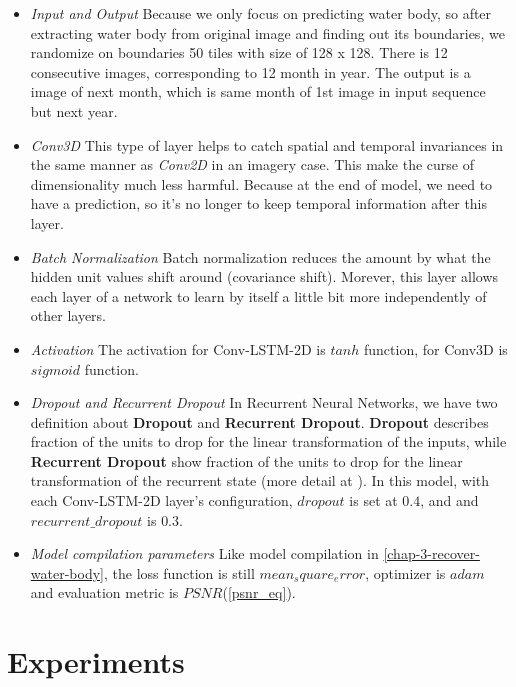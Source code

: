 \begin{itemize}
	\item \textit{Input and Output} Because we only focus on predicting water body, so after extracting water body from original image and finding out its boundaries, we randomize on boundaries 50 tiles with size of 128 x 128. There is 12 consecutive images, corresponding to 12 month in year. The output is a image of next month, which is same month of 1st image in input sequence but next year. 
	
	\item \textit{Conv3D} This type of layer helps to catch spatial and temporal invariances in the same manner as \textit{Conv2D} in an imagery case. This make the curse of dimensionality much less harmful. Because at the end of model, we need to have a prediction, so it's no longer to keep temporal information after this layer.
	
	\item \textit{Batch Normalization} Batch normalization reduces the amount by what the hidden unit values shift around (covariance shift). Morever, this layer allows each layer of a network to learn by itself a little bit more independently of other layers.
	
	\item \textit{Activation} The activation for Conv-LSTM-2D is $tanh$ function, for Conv3D is $sigmoid$ function.
	
	\item \textit{Dropout and Recurrent Dropout} In Recurrent Neural Networks, we have two definition about \textbf{Dropout} and \textbf{Recurrent Dropout}. \textbf{Dropout} describes fraction of the units to drop for the linear transformation of the inputs, while \textbf{Recurrent Dropout} show fraction of the units to drop for the linear transformation of the recurrent state (more detail at \cite{Gal2015}). In this model, with each Conv-LSTM-2D layer's configuration, $dropout$ is set at $0.4$, and and $recurrent\_dropout$ is $0.3$.
	
	\item \textit{Model compilation parameters} Like model compilation in \ref{chap-3-recover-water-body}, the loss function is still $mean_square_error$, optimizer is $adam$ and evaluation metric is $PSNR$(\ref{psnr_eq}). 
	
\end{itemize}

\section{Experiments}

